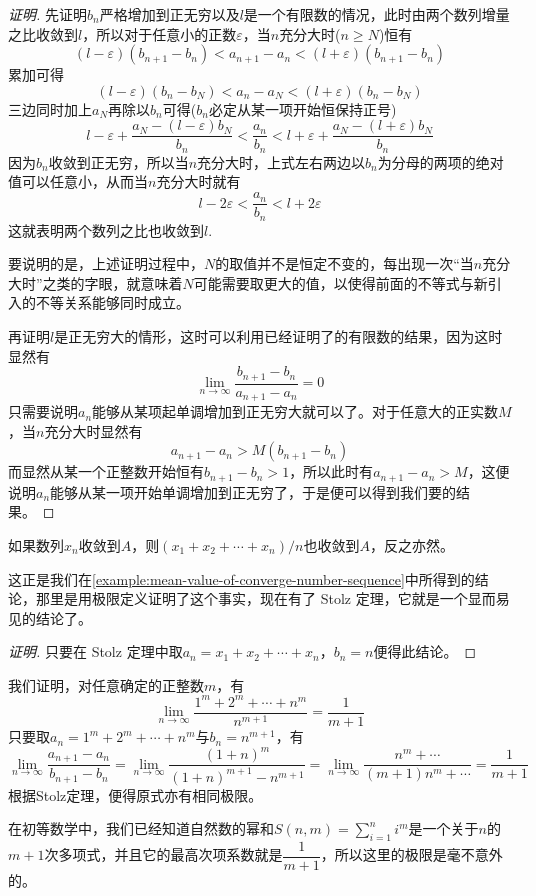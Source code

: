 \begin{proof}[证明]
  先证明$b_n$严格增加到正无穷以及$l$是一个有限数的情况，此时由两个数列增量之比收敛到$l$，所以对于任意小的正数$\varepsilon$，当$n$充分大时($n \geqslant N$)恒有
  \[ (l-\varepsilon)(b_{n+1}-b_n) < a_{n+1}-a_n < (l+\varepsilon)(b_{n+1}-b_n) \]
  累加可得
  \[ (l-\varepsilon)(b_{n}-b_N) < a_{n}-a_N < (l+\varepsilon)(b_{n}-b_N) \]
  三边同时加上$a_N$再除以$b_n$可得($b_n$必定从某一项开始恒保持正号)
  \[ l-\varepsilon+\frac{a_N-(l-\varepsilon)b_N}{b_n} < \frac{a_n}{b_n} < l+\varepsilon+\frac{a_N-(l+\varepsilon)b_N}{b_n}\]
  因为$b_n$收敛到正无穷，所以当$n$充分大时，上式左右两边以$b_n$为分母的两项的绝对值可以任意小，从而当$n$充分大时就有
  \[ l-2\varepsilon < \frac{a_n}{b_n} < l + 2\varepsilon \]
  这就表明两个数列之比也收敛到$l$.

  要说明的是，上述证明过程中，$N$的取值并不是恒定不变的，每出现一次“当$n$充分大时”之类的字眼，就意味着$N$可能需要取更大的值，以使得前面的不等式与新引入的不等关系能够同时成立。

  再证明$l$是正无穷大的情形，这时可以利用已经证明了的有限数的结果，因为这时显然有
  \[ \lim_{n \to \infty} \frac{b_{n+1}-b_n}{a_{n+1}-a_n} = 0 \]
  只需要说明$a_n$能够从某项起单调增加到正无穷大就可以了。对于任意大的正实数$M$，当$n$充分大时显然有
  \[ a_{n+1}-a_n > M(b_{n+1}-b_n) \]
  而显然从某一个正整数开始恒有$b_{n+1}-b_n>1$，所以此时有$a_{n+1}-a_n>M$，这便说明$a_n$能够从某一项开始单调增加到正无穷了，于是便可以得到我们要的结果。
\end{proof}

\begin{inference}
  如果数列$x_n$收敛到$A$，则$(x_1+x_2+\cdots+x_n)/n$也收敛到$A$，反之亦然。
\end{inference}

这正是我们在\autoref{example:mean-value-of-converge-number-sequence}中所得到的结论，那里是用极限定义证明了这个事实，现在有了 Stolz 定理，它就是一个显而易见的结论了。

\begin{proof}[证明]
  只要在 Stolz 定理中取$a_n=x_1+x_2+\cdots+x_n$，$b_n=n$便得此结论。
\end{proof}

\begin{example}
  我们证明，对任意确定的正整数$m$，有
  \[ \lim_{n \to \infty} \frac{1^m+2^m+\cdots+n^m}{n^{m+1}} = \frac{1}{m+1} \]
  只要取$a_n=1^m+2^m+\cdots+n^m$与$b_n=n^{m+1}$，有
  \[ \lim_{n \to \infty} \frac{a_{n+1}-a_n}{b_{n+1}-b_n} = \lim_{n \to \infty} \frac{(1+n)^m}{(1+n)^{m+1}-n^{m+1}} = \lim_{n \to \infty} \frac{n^m+\cdots}{(m+1)n^m+\cdots} = \frac{1}{m+1} \]
  根据Stolz定理，便得原式亦有相同极限。

  在初等数学中，我们已经知道自然数的幂和$S(n,m)=\sum\limits_{i=1}^ni^m$是一个关于$n$的$m+1$次多项式，并且它的最高次项系数就是$\dfrac{1}{m+1}$，所以这里的极限是毫不意外的。
\end{example}

